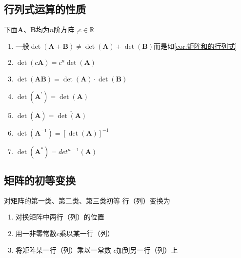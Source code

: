 \subsection{行列式运算的性质}
\begin{formal}
\begin{proposition}[行列式的若干性质]\label{prop:行列式的若干性质}
下面$\bm{A}$、$\bm{B}$均为$n$阶方阵
,$c \in \mathbb{R} $
\begin{enumerate}[label=\textup{(\arabic*)}]
    \item 一般$ \det\left(\bm{A}
    + \bm{B}\right) \neq  \det\left(
        \bm{A}
    \right) +  \det\left(\bm{B}\right)$而是如\cref{cor:矩阵和的行列式}
    \item $ \det\left(c\bm{A}\right) = 
    c^n  \det\left(\bm{A}\right)$
    \item $ \det\left(\bm{AB}\right) = 
     \det\left(\bm{A}\right) \cdot
     \det\left(\bm{B}\right)$
    \item $ \det\left(\bm{A}^{\prime}\right) = 
     \det\left(\bm{A}\right)$
    \item $ \det\left(\overline{\bm{A}} 
    \right) = \overline{
         \det\left(\bm{A}\right)}$
    \item $ \det\left(\bm{A}^{-1}\right)
    = \left[ \det\left(\bm{A}
    \right)\right]^{-1}$
    \item $ \det\left(\bm{A}^*\right) = 
    det^{n - 1}\left(\bm{A}\right)$
\end{enumerate}
\end{proposition}
\end{formal}
\subsection{矩阵的初等变换}
\begin{formal}
\begin{definition}[矩阵的初等变换]\label{def:矩阵的初等变换}
    对矩阵的第一类、第二类、第三类初等
    行（列）变换为
    \begin{enumerate}[label=\textup{(\arabic*)}]
        \item 对换矩阵中两行（列）的位置
        \item 用一非零常数$c$乘以某一行（列）
        \item 将矩阵某一行（列）乘以一常数
        $c$加到另一行（列）上
    \end{enumerate}
\end{definition}
\end{formal}
